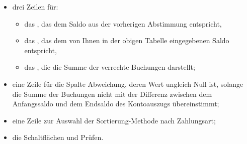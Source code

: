 \begin{itemize}
\begin{enumerate}
	\end{enumerate} 
	\item drei Zeilen für:
	\begin{itemize}
		\item das , das dem Saldo aus der vorherigen Abstimmung entspricht,
		\item das , das dem von Ihnen in der obigen Tabelle eingegebenen Saldo entspricht,
		\item das , die die Summe der verrechte Buchungen darstellt;
	\end{itemize}
	\item eine Zeile für die Spalte {Abweichung}, deren Wert ungleich Null ist, solange die Summe der Buchungen nicht mit der Differenz zwischen dem Anfangssaldo und dem Endsaldo des Kontoauszugs übereinstimmt;
	\item eine Zeile zur Auswahl der \gls{Sortierung}-Methode nach Zahlungsart;
	\item die Schaltflächen  und {Prüfen}.
\end{itemize}



